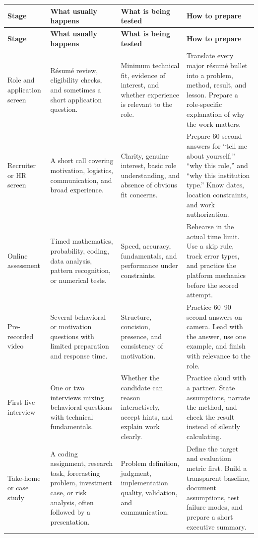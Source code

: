 \documentclass[11pt,letterpaper,openany]{book}
\begin{document}
\begin{longtable}{@{}L{0.16\textwidth}L{0.25\textwidth}L{0.25\textwidth}L{0.26\textwidth}@{}}
\toprule
\textbf{Stage} & \textbf{What usually happens} & \textbf{What is being tested} & \textbf{How to prepare} \\
\midrule
\endfirsthead
\toprule
\textbf{Stage} & \textbf{What usually happens} & \textbf{What is being tested} & \textbf{How to prepare} \\
\midrule
\endhead
Role and application screen & R\'esum\'e review, eligibility checks, and sometimes a short application question. & Minimum technical fit, evidence of interest, and whether experience is relevant to the role. & Translate every major r\'esum\'e bullet into a problem, method, result, and lesson. Prepare a role-specific explanation of why the work matters. \\
Recruiter or HR screen & A short call covering motivation, logistics, communication, and broad experience. & Clarity, genuine interest, basic role understanding, and absence of obvious fit concerns. & Prepare 60-second answers for ``tell me about yourself,'' ``why this role,'' and ``why this institution type.'' Know dates, location constraints, and work authorization. \\
Online assessment & Timed mathematics, probability, coding, data analysis, pattern recognition, or numerical tests. & Speed, accuracy, fundamentals, and performance under constraints. & Rehearse in the actual time limit. Use a skip rule, track error types, and practice the platform mechanics before the scored attempt. \\
Pre-recorded video & Several behavioral or motivation questions with limited preparation and response time. & Structure, concision, presence, and consistency of motivation. & Practice 60--90 second answers on camera. Lead with the answer, use one example, and finish with relevance to the role. \\
First live interview & One or two interviews mixing behavioral questions with technical fundamentals. & Whether the candidate can reason interactively, accept hints, and explain work clearly. & Practice aloud with a partner. State assumptions, narrate the method, and check the result instead of silently calculating. \\
Take-home or case study & A coding assignment, research task, forecasting problem, investment case, or risk analysis, often followed by a presentation. & Problem definition, judgment, implementation quality, validation, and communication. & Define the target and evaluation metric first. Build a transparent baseline, document assumptions, test failure modes, and prepare a short executive summary. \\

\end{longtable}
\end{document}
